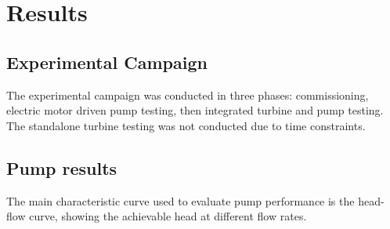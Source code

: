 \section{Results}



\subsection{Experimental Campaign}

The experimental campaign was conducted in three phases: commissioning, electric motor driven pump testing, then integrated turbine and pump testing. The standalone turbine testing was not conducted due to time constraints.

\subsection{Pump results}

The main characteristic curve used to evaluate pump performance is the head-flow curve, showing the achievable head at different flow rates. 




